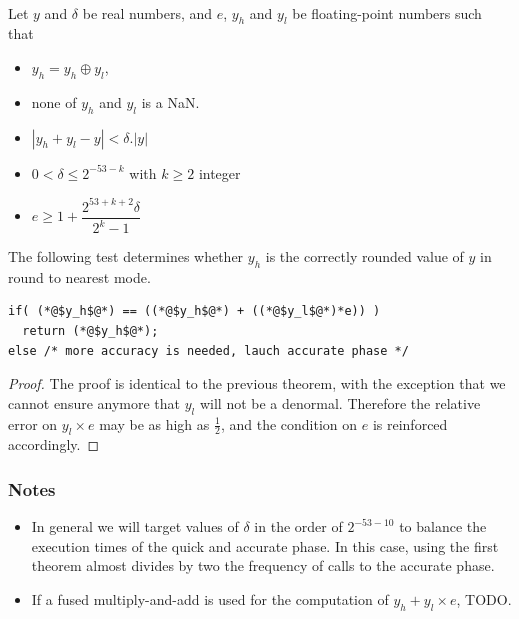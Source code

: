 \begin{theorem}
\label{th:roundingRN2}
~\\
  Let $y$ and $\delta$ be real numbers, and $e$, $y_h$ and $y_l$ be
  floating-point numbers such that 
  \begin{itemize}
  \item $y_h=y_h\oplus y_l$,
  \item none of $y_h$ and $y_l$ is a  NaN.
  \item $|y_h+y_l - y| < \delta.|y|$
  \item $0< \delta \le 2^{-53-k}$ with $k\ge 2$ integer
  \item $e\ge 1+  \dfrac{2^{53+k+2}\delta}{2^{k}-1}$
\end{itemize}

The following test determines whether $y_h$ is the
  correctly rounded value of $y$ in  round to nearest mode.

\begin{lstlisting}[firstnumber=1]
if( (*@$y_h$@*) == ((*@$y_h$@*) + ((*@$y_l$@*)*e)) )
  return (*@$y_h$@*);
else /* more accuracy is needed, lauch accurate phase */
\end{lstlisting}
\end{theorem}

\begin{proof}
  The proof is identical to the previous theorem, with the exception
  that we cannot ensure anymore that $y_l$ will not be a denormal.
  Therefore the relative error on $y_l\times e$ may be as high as
  $\frac{1}{2}$, and the condition on $e$ is reinforced accordingly.
\end{proof}


\subsubsection*{Notes}

\begin{itemize}
\item In general we will target values of $\delta$ in the order of
  $2^{-53-10}$ to balance the execution times of the quick and
  accurate phase. In this case, using the first theorem almost divides
  by two the frequency of calls to the accurate phase. 
\item If a fused multiply-and-add is  used for the
  computation of $y_h+y_l\times e$, TODO.
\end{itemize}




